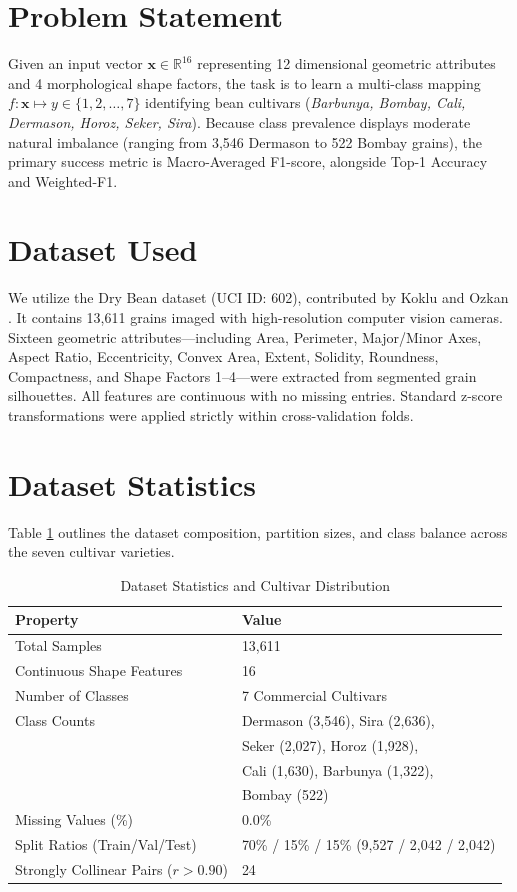 \documentclass[conference,10pt]{IEEEtran}
\begin{document}
\section{Problem Statement}
Given an input vector $\mathbf{x} \in \mathbb{R}^{16}$ representing 12 dimensional geometric attributes and 4 morphological shape factors, the task is to learn a multi-class mapping $f: \mathbf{x} \mapsto y \in \{1, 2, \dots, 7\}$ identifying bean cultivars (\textit{Barbunya, Bombay, Cali, Dermason, Horoz, Seker, Sira}). Because class prevalence displays moderate natural imbalance (ranging from 3,546 Dermason to 522 Bombay grains), the primary success metric is Macro-Averaged F1-score, alongside Top-1 Accuracy and Weighted-F1.

\section{Dataset Used}
We utilize the Dry Bean dataset (UCI ID: 602), contributed by Koklu and Ozkan \cite{koklu2020}. It contains 13,611 grains imaged with high-resolution computer vision cameras. Sixteen geometric attributes—including Area, Perimeter, Major/Minor Axes, Aspect Ratio, Eccentricity, Convex Area, Extent, Solidity, Roundness, Compactness, and Shape Factors 1--4—were extracted from segmented grain silhouettes. All features are continuous with no missing entries. Standard z-score transformations were applied strictly within cross-validation folds.

\section{Dataset Statistics}
Table \ref{tab:dataset} outlines the dataset composition, partition sizes, and class balance across the seven cultivar varieties.

\begin{table}[htbp]
\caption{Dataset Statistics and Cultivar Distribution}
\label{tab:dataset}
\centering
\begin{tabular}{ll}
\toprule
\textbf{Property} & \textbf{Value} \\
\midrule
Total Samples & 13,611 \\
Continuous Shape Features & 16 \\
Number of Classes & 7 Commercial Cultivars \\
Class Counts & Dermason (3,546), Sira (2,636), \\
             & Seker (2,027), Horoz (1,928), \\
             & Cali (1,630), Barbunya (1,322), \\
             & Bombay (522) \\
Missing Values (\%) & 0.0\% \\
Split Ratios (Train/Val/Test) & 70\% / 15\% / 15\% (9,527 / 2,042 / 2,042) \\
Strongly Collinear Pairs ($r > 0.90$) & 24 \\
\bottomrule
\end{tabular}
\end{table}
\end{document}
